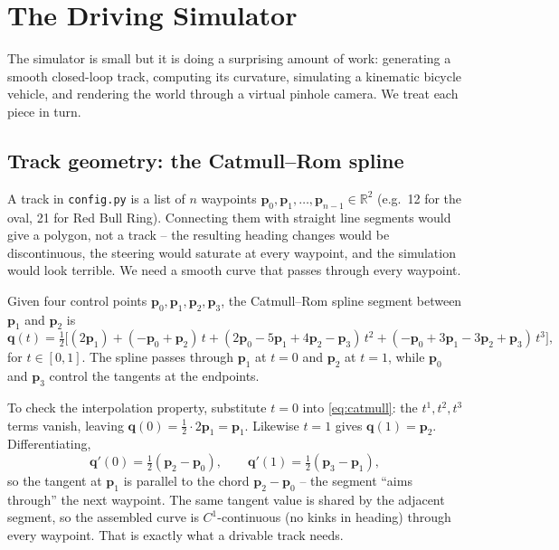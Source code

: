 \section{The Driving Simulator}
\label{sec:sim}

The simulator is small but it is doing a surprising amount of work:
generating a smooth closed-loop track, computing its curvature,
simulating a kinematic bicycle vehicle, and rendering the world
through a virtual pinhole camera. We treat each piece in turn.

\subsection{Track geometry: the Catmull--Rom spline}

A track in \texttt{config.py} is a list of $n$ waypoints
$\mathbf{p}_0,\mathbf{p}_1,\ldots,\mathbf{p}_{n-1}\in\mathbb{R}^2$
(e.g.\ 12 for the oval, 21 for Red Bull Ring). Connecting them with
straight line segments would give a polygon, not a track -- the
resulting heading changes would be discontinuous, the steering would
saturate at every waypoint, and the simulation would look terrible. We
need a smooth curve that passes through every waypoint.

\begin{definition}
Given four control points $\mathbf{p}_0,\mathbf{p}_1,\mathbf{p}_2,\mathbf{p}_3$,
the Catmull--Rom spline segment between $\mathbf{p}_1$ and
$\mathbf{p}_2$ is
\begin{equation}
\mathbf{q}(t)=\tfrac{1}{2}\Big[
  (2\mathbf{p}_1)
  + (-\mathbf{p}_0+\mathbf{p}_2)\,t
  + (2\mathbf{p}_0-5\mathbf{p}_1+4\mathbf{p}_2-\mathbf{p}_3)\,t^2
  + (-\mathbf{p}_0+3\mathbf{p}_1-3\mathbf{p}_2+\mathbf{p}_3)\,t^3
\Big],
\label{eq:catmull}
\end{equation}
for $t\in[0,1]$. The spline passes through $\mathbf{p}_1$ at $t=0$ and
$\mathbf{p}_2$ at $t=1$, while $\mathbf{p}_0$ and $\mathbf{p}_3$ control
the tangents at the endpoints.
\end{definition}

To check the interpolation property, substitute $t=0$ into
\eqref{eq:catmull}: the $t^1,t^2,t^3$ terms vanish, leaving
$\mathbf{q}(0)=\tfrac{1}{2}\cdot 2\mathbf{p}_1 = \mathbf{p}_1$.
Likewise $t=1$ gives $\mathbf{q}(1)=\mathbf{p}_2$. Differentiating,
\[
\mathbf{q}'(0)=\tfrac{1}{2}(\mathbf{p}_2-\mathbf{p}_0),\qquad
\mathbf{q}'(1)=\tfrac{1}{2}(\mathbf{p}_3-\mathbf{p}_1),
\]
so the tangent at $\mathbf{p}_1$ is parallel to the chord
$\mathbf{p}_2-\mathbf{p}_0$ -- the segment ``aims through'' the next
waypoint. The same tangent value is shared by the adjacent segment, so
the assembled curve is $C^1$-continuous (no kinks in heading) through
every waypoint. That is exactly what a drivable track needs.

